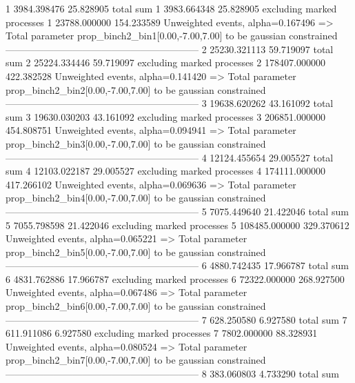 1          3984.398476     25.828905       total sum                     
1          3983.664348     25.828905       excluding marked processes    
1          23788.000000    154.233589      Unweighted events, alpha=0.167496
  => Total parameter prop_binch2_bin1[0.00,-7.00,7.00] to be gaussian constrained
------------------------------------------------------------
2          25230.321113    59.719097       total sum                     
2          25224.334446    59.719097       excluding marked processes    
2          178407.000000   422.382528      Unweighted events, alpha=0.141420
  => Total parameter prop_binch2_bin2[0.00,-7.00,7.00] to be gaussian constrained
------------------------------------------------------------
3          19638.620262    43.161092       total sum                     
3          19630.030203    43.161092       excluding marked processes    
3          206851.000000   454.808751      Unweighted events, alpha=0.094941
  => Total parameter prop_binch2_bin3[0.00,-7.00,7.00] to be gaussian constrained
------------------------------------------------------------
4          12124.455654    29.005527       total sum                     
4          12103.022187    29.005527       excluding marked processes    
4          174111.000000   417.266102      Unweighted events, alpha=0.069636
  => Total parameter prop_binch2_bin4[0.00,-7.00,7.00] to be gaussian constrained
------------------------------------------------------------
5          7075.449640     21.422046       total sum                     
5          7055.798598     21.422046       excluding marked processes    
5          108485.000000   329.370612      Unweighted events, alpha=0.065221
  => Total parameter prop_binch2_bin5[0.00,-7.00,7.00] to be gaussian constrained
------------------------------------------------------------
6          4880.742435     17.966787       total sum                     
6          4831.762886     17.966787       excluding marked processes    
6          72322.000000    268.927500      Unweighted events, alpha=0.067486
  => Total parameter prop_binch2_bin6[0.00,-7.00,7.00] to be gaussian constrained
------------------------------------------------------------
7          628.250580      6.927580        total sum                     
7          611.911086      6.927580        excluding marked processes    
7          7802.000000     88.328931       Unweighted events, alpha=0.080524
  => Total parameter prop_binch2_bin7[0.00,-7.00,7.00] to be gaussian constrained
------------------------------------------------------------
8          383.060803      4.733290        total sum                     
